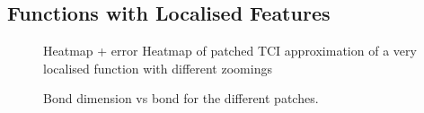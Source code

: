 \subsection{Functions with Localised Features}

\begin{figure}[h!]
	\caption{Heatmap + error Heatmap of patched TCI approximation of a very localised function with different zoomings  }
\end{figure}

\begin{figure}[h!]
	\caption{Bond dimension vs bond for the different patches. }
\end{figure}




